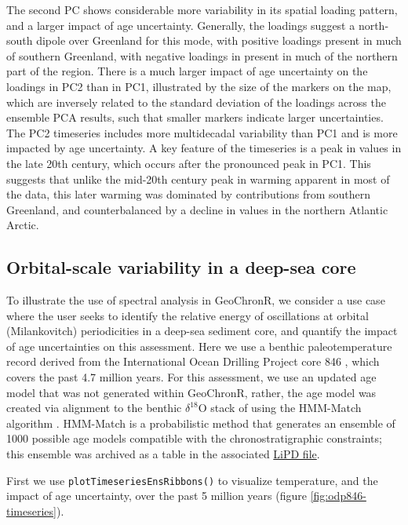 \documentclass[gchron, manuscript]{copernicus}
\begin{document}
The second PC shows considerable more variability in its spatial loading pattern, and a larger impact of age uncertainty.
Generally, the loadings suggest a north-south dipole over Greenland for this mode, with positive loadings present in much of southern Greenland, with negative loadings in present in much of the northern part of the region.
There is a much larger impact of age uncertainty on the loadings in PC2 than in PC1, illustrated by the size of the markers on the map, which are inversely related to the standard deviation of the loadings across the ensemble PCA results, such that smaller markers indicate larger uncertainties.
The PC2 timeseries includes more multidecadal variability than PC1 and is more impacted by age uncertainty.
A key feature of the timeseries is a peak in values in the late 20th century, which occurs after the pronounced peak in PC1.
This suggests that unlike the mid-20th century peak in warming apparent in most of the data, this later warming was dominated by contributions from southern Greenland, and counterbalanced by a decline in values in the northern Atlantic Arctic.

\hypertarget{sec:spec_vignette}{%
\subsection{Orbital-scale variability in a deep-sea core}\label{sec:spec_vignette}}

To illustrate the use of spectral analysis in GeoChronR, we consider a use case where the user seeks to identify the relative energy of oscillations at orbital (Milankovitch) periodicities in a deep-sea sediment core, and quantify the impact of age uncertainties on this assessment.
Here we use a benthic paleotemperature record derived from the International Ocean Drilling Project core 846 \citep{mix1995benthic, Shackleton95}, which covers the past 4.7 million years.
For this assessment, we use an updated age model that was not generated within GeoChronR, rather, the age model was created via alignment to the benthic \(\delta^{18}\mathrm{O}\) stack of \citet{LisieckiRaymo05} using the HMM-Match algorithm \citep{ProbStack, khider2017}.
HMM-Match is a probabilistic method that generates an ensemble of 1000 possible age models compatible with the chronostratigraphic constraints; this ensemble was archived as a table in the associated \href{http://lipdverse.org/geoChronR-examples/ODP846.Lawrence.2006.lpd}{LiPD file}.

First we use \texttt{plotTimeseriesEnsRibbons()} to visualize temperature, and the impact of age uncertainty, over the past 5 million years (figure \ref{fig:odp846-timeseries}).
\end{document}
